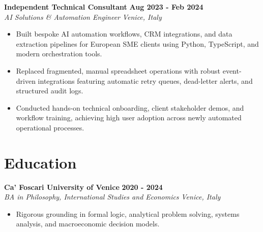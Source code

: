 \documentclass[10pt,a4paper]{article}
\newcommand{\role}[4]{%
  \textbf{#1} \hfill \textbf{#2}\\[1pt]%
  \textit{#3} \hfill \textit{#4}\\[2pt]%
}
\begin{document}
\role{Independent Technical Consultant}{Aug 2023 - Feb 2024}{AI Solutions \& Automation Engineer}{Venice, Italy}
\begin{itemize}
  \item Built bespoke AI automation workflows, CRM integrations, and data extraction pipelines for European SME clients using Python, TypeScript, and modern orchestration tools.
  \item Replaced fragmented, manual spreadsheet operations with robust event-driven integrations featuring automatic retry queues, dead-letter alerts, and structured audit logs.
  \item Conducted hands-on technical onboarding, client stakeholder demos, and workflow training, achieving high user adoption across newly automated operational processes.
\end{itemize}

\section{Education}
\role{Ca' Foscari University of Venice}{2020 - 2024}{BA in Philosophy, International Studies and Economics}{Venice, Italy}
\begin{itemize}
  \item Rigorous grounding in formal logic, analytical problem solving, systems analysis, and macroeconomic decision models.
\end{itemize}
\end{document}

